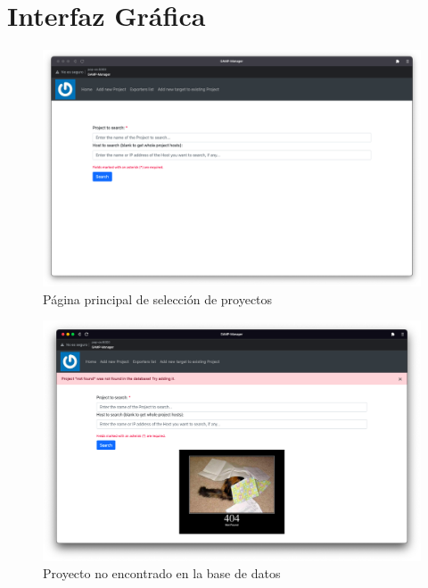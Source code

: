 \section*{Interfaz Gráfica}
\label{sec:appendix_gui}
\begin{figure}[H]
    \includegraphics[width=\textwidth]{include/desarrollo/app_images/home.png}
    \caption{Página principal de selección de proyectos}
    \label{fig:gui_home}
\end{figure}

\begin{figure}[H]
    \includegraphics[width=\textwidth]{include/desarrollo/app_images/project_not_found.png}
    \caption{Proyecto no encontrado en la base de datos}
    \label{fig:gui_project_not_found}
\end{figure}


